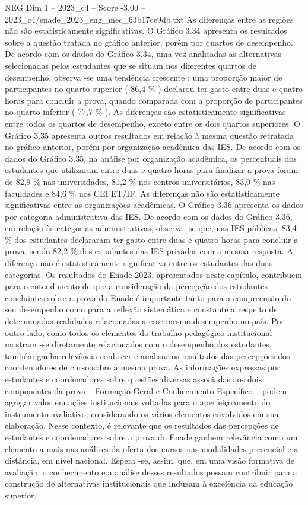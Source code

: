 \begin{textsample}{NEG Dim 1 – 2023\_c4 – Score -3.00 – 2023\_c4/enade\_2023\_eng\_mec\_63b17ce9db.txt}
As diferenças entre as regiões não são estatisticamente significativas.
O Gráfico 3.34 apresenta os resultados sobre a questão tratada no gráfico anterior, porém por quartos de desempenho.
De acordo com os dados do Gráfico 3.34, uma vez analisadas as alternativas selecionadas pelos estudantes que se situam nos diferentes quartos de desempenho, observa -se uma tendência crescente : uma proporção maior de participantes no quarto superior ( 86,4 \% ) declarou ter gasto entre duas e quatro horas para concluir a prova, quando comparada com a proporção de participantes no quarto inferior ( 77,7 \% ).
As diferenças são estatisticamente significativas entre todos os quartos de desempenho, exceto entre os dois quartos superiores.
O Gráfico 3.35 apresenta outros resultados em relação à mesma questão retratada no gráfico anterior, porém por organização acadêmica das IES.
De acordo com os dados do Gráfico 3.35, na análise por organização acadêmica, os percentuais dos estudantes que utilizaram entre duas e quatro horas para finalizar a prova foram de 82,9 \% nas universidades, 81,2 \% nos centros universitários, 83,0 \% nas faculdades e 84,6 \% nos CEFET/IF.
As diferenças não são estatisticamente significativas entre as organizações acadêmicas.
O Gráfico 3.36 apresenta os dados por categoria administrativa das IES.
De acordo com os dados do Gráfico 3.36, em relação às categorias administrativas, observa -se que, nas IES públicas, 83,4 \% dos estudantes declararam ter gasto entre duas e quatro horas para concluir a prova, sendo 82,2 \% dos estudantes das IES privadas com a mesma resposta.
A diferença não é estatisticamente significativa entre os estudantes das duas categorias.
Os resultados do Enade 2023, apresentados neste capítulo, contribuem para o entendimento de que a consideração da percepção dos estudantes concluintes sobre a prova do Enade é importante tanto para a compreensão do seu desempenho como para a reflexão sistemática e constante a respeito de determinadas realidades relacionadas a esse mesmo desempenho no país.
Por outro lado, como todos os elementos do trabalho pedagógico institucional mostram -se diretamente relacionados com o desempenho dos estudantes, também ganha relevância conhecer e analisar os resultados das percepções dos coordenadores de curso sobre a mesma prova.
As informações expressas por estudantes e coordenadores sobre questões diversas associadas aos dois componentes da prova – Formação Geral e Conhecimento Específico – podem agregar valor em ações institucionais voltadas para o aperfeiçoamento do instrumento avaliativo, considerando os vários elementos envolvidos em sua elaboração.
Nesse contexto, é relevante que os resultados das percepções de estudantes e coordenadores sobre a prova do Enade ganhem relevância como um elemento a mais nas análises da oferta dos cursos nas modalidades presencial e a distância, em nível nacional.
Espera -se, assim, que, em uma visão formativa de avaliação, o conhecimento e a análise desses resultados possam contribuir para a construção de alternativas institucionais que induzam à excelência da educação superior.

\end{textsample}
